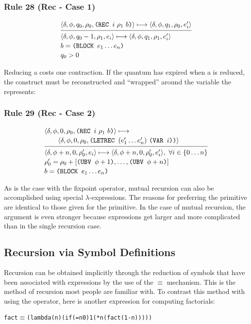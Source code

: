 \subsubsection*{Rule 28 (Rec - Case 1)}
\[
\semanticrule{
\cfg{\delta}{\phi}{q_0}{\rho_0}{\THOR{(REC }i\ \rho_1\ b\THOR{)}}\redsto
\cfg{\delta}{\phi}{q_1}{\rho_0}{e'_i}
}{
\cfg{\delta}{\phi}{q_0-1}{\rho_1}{e_i}\redsto
\cfg{\delta}{\phi}{q_1}{\rho_1}{e'_i}\\
b=\THOR{(BLOCK }e_1\ldots e_n\THOR{)}\\ q_0>0
}
\]

Reducing a  costs one contraction. If the quantum has expired when a
 is reduced, the  construct must be reconstructed and
``wrapped'' around the variable the  represents:

\subsubsection*{Rule 29 (Rec - Case 2)}
\[
\semanticrule{
\cfg{\delta}{\phi}{0}{\rho_0}{\THOR{(REC }i\ \rho_1\ b\THOR{)}}\redsto\\ \qquad
\cfg{\delta}{\phi}{0}{\rho_0}{\THOR{(LETREC }(e'_1\ldots e'_n)\ \THOR{(VAR }i\THOR{))}}
}{
\cfg{\delta}{\phi+n}{0}{\rho'_0}{e_i}\redsto
\cfg{\delta}{\phi+n}{0}{\rho'_0}{e'_i},\ \forall i\in\{0\ldots n\}\\
\rho'_0=\rho_0+[\THOR{(UBV }\phi+1\THOR{)},\ldots,\THOR{(UBV }\phi+n\THOR{)}]\\ b=\THOR{(BLOCK }e_1\ldots e_n\THOR{)}
}
\]

As is the case with the fixpoint operator, mutual recursion can also be
accomplished using special \(\lambda\)-expressions. The reasons for preferring
the  primitive are identical to those given for the 
primitive. In the case of mutual recursion, the argument is even stronger
because expressions get larger and more complicated than in the single recursion
case.

\subsection{Recursion via Symbol Definitions}

Recursion can be obtained implicitly through the reduction of symbols that have
been associated with expressions by the use of the \(\equiv\) mechanism. This is the
method of recursion most people are familiar with. To contrast this method with
using the  operator, here is another expression for computing
factorials:
\par\smallskip\noindent\begin{minipage}{\linewidth}
\begin{alltt}
fact \(\equiv\) (lambda (n) (if (= n 0) 1 (* n (fact (1- n)))))
\end{alltt}
\end{minipage}\par\smallskip

